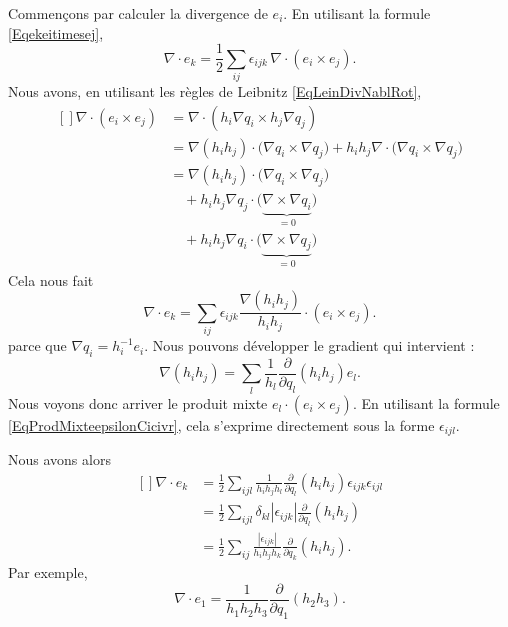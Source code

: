 Commençons par calculer la divergence de $e_i$. En utilisant la formule \eqref{Eqekeitimesej},
\begin{equation}
    \nabla\cdot e_k=\frac{ 1 }{2}\sum_{ij}\epsilon_{ijk}\,\nabla\cdot (e_i\times e_j).
\end{equation}
Nous avons, en utilisant les règles de Leibnitz \eqref{EqLeinDivNablRot}, 
\begin{equation}
    \begin{aligned}[]
        \nabla\cdot(e_i\times e_j)&=\nabla\cdot(h_i\nabla q_i\times h_j\nabla q_j)\\
        &=\nabla(h_ih_j)\cdot\big( \nabla q_i\times\nabla q_j \big)+h_ih_j\nabla\cdot\big( \nabla q_i\times\nabla q_j \big)\\
        &=\nabla(h_ih_j)\cdot\big( \nabla q_i\times\nabla q_j \big)\\
        &\quad+h_ih_j\nabla q_j\cdot\big( \underbrace{\nabla\times\nabla q_i}_{=0} \big)\\
        &\quad+h_ih_j\nabla q_i\cdot\big( \underbrace{\nabla\times\nabla q_j}_{=0} \big)
    \end{aligned}
\end{equation}
Cela nous fait
\begin{equation}
    \nabla\cdot e_k=\sum_{ij}\epsilon_{ijk}\frac{ \nabla(h_ih_j) }{ h_ih_j }\cdot (e_i\times e_j).
\end{equation}
parce que $\nabla q_i=h_i^{-1}e_i$. Nous pouvons développer le gradient qui intervient :
\begin{equation}
    \nabla(h_ih_j)=\sum_l\frac{1}{ h_l }\frac{ \partial  }{ \partial q_l }(h_ih_j)e_l.
\end{equation}
Nous voyons donc arriver le produit mixte $e_l\cdot (e_i\times e_j)$. En utilisant la formule \eqref{EqProdMixteepsilonCicivr}, cela s'exprime directement sous la forme $\epsilon_{ijl}$.

Nous avons alors
\begin{equation}        \label{EqFragradekdvi}
    \begin{aligned}[]
        \nabla\cdot e_k&=\frac{ 1 }{2}\sum_{ijl}\frac{1}{ h_ih_jh_l }\frac{ \partial  }{ \partial q_l }(h_ih_j)\epsilon_{ijk}\epsilon_{ijl}\\
        &=\frac{ 1 }{2}\sum_{ijl}\delta_{kl}| \epsilon_{ijk} |\frac{ \partial  }{ \partial q_l }(h_ih_j)\\
        &=\frac{ 1 }{2}\sum_{ij}\frac{| \epsilon_{ijk} |}{ h_ih_jh_k }\frac{ \partial  }{ \partial q_k }(h_ih_j).
    \end{aligned}
\end{equation}
Par exemple,
\begin{equation}
    \nabla\cdot e_1=\frac{1}{ h_1h_2h_3 }\frac{ \partial  }{ \partial q_1 }(h_2h_3).
\end{equation}

